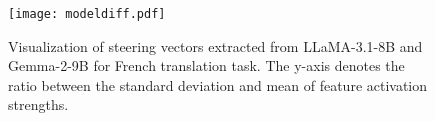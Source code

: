 \begin{figure}[tb]
    \centering
    \texttt{[image: modeldiff.pdf]}
    \caption{Visualization of steering vectors extracted from LLaMA-3.1-8B and Gemma-2-9B for French translation task. The y-axis denotes the ratio between the standard deviation and mean of feature activation strengths.}
    \label{fig:cross-model}
\end{figure}